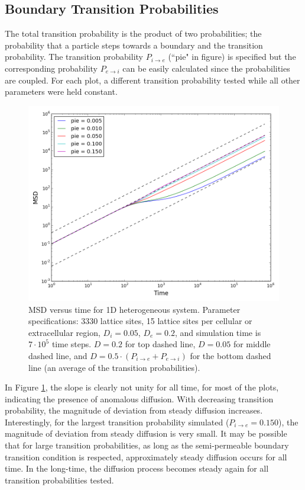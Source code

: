 \subsection{Boundary Transition Probabilities}
\label{sec:1D-boundary-transition-probabilities}
	The total transition probability is the product of two probabilities; the probability that a particle steps towards a boundary and the transition probability. The transition probability $ P_{i \rightarrow e} $ (``pie" in figure) is specified but the corresponding probability  $ P_{e \rightarrow i} $ can be easily calculated since the probabilities are coupled. For each plot, a different transition probability tested while all other parameters were held constant.
	
	\begin{figure}[h!]
		\centering
		\includegraphics[width=1.0\linewidth]{../images/1D/pie_msd_1D}
		\caption{MSD versus time for 1D heterogeneous system. Parameter specifications: 3330 lattice sites, 15 lattice sites per cellular or extracellular region, $ D_i = 0.05 $, $ D_e = 0.2 $, and simulation time is $ 7\cdot 10^5 $ time steps. $ D = 0.2 $ for top dashed line, $ D = 0.05 $ for middle dashed line, and $ D = 0.5 \cdot (P_{i \rightarrow e} + P_{e \rightarrow i}) $ for the bottom dashed line (an average of the transition probabilities).}
		\label{fig:pie_msd_1D}
	\end{figure}
	
	 In Figure \ref{fig:pie_msd_1D}, the slope is clearly not unity for all time, for most of the plots, indicating the presence of anomalous diffusion. With decreasing transition probability, the magnitude of deviation from steady diffusion increases. Interestingly, for the largest transition probability simulated ($ P_{i \rightarrow e} = 0.150 $), the magnitude of deviation from steady diffusion is very small. It may be possible that for large transition probabilities, as long as the semi-permeable boundary transition condition is respected, approximately steady diffusion occurs for all time. In the long-time, the diffusion process becomes steady again for all transition probabilities tested. 
	 
